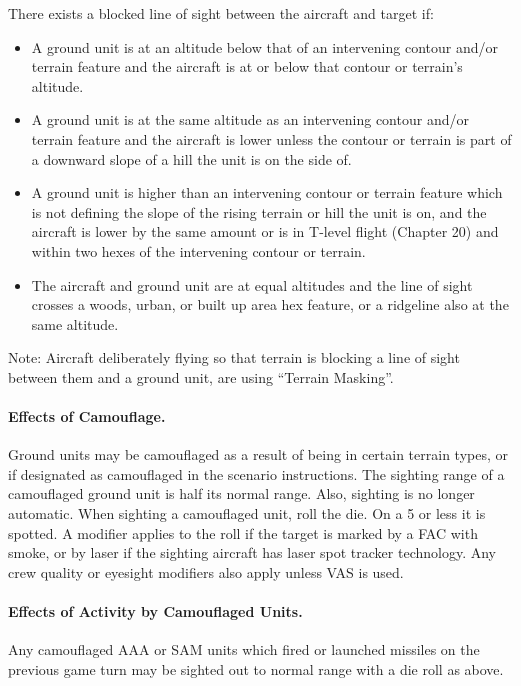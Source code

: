 There exists a blocked line of sight between the aircraft and target if:

\begin{itemize}

    \item A ground unit is at an altitude below that of an intervening contour and/or terrain feature and the aircraft is at or below that contour or terrain's altitude.

    \item A ground unit is at the same altitude as an intervening contour and/or terrain feature and the aircraft is lower unless the contour or terrain is part of a downward slope of a hill the unit is on the side of.

    \item A ground unit is higher than an intervening contour or terrain feature which is not defining the slope of the rising terrain or hill the unit is on, and the aircraft is lower by the same amount or is in T-level flight (Chapter 20) and within two hexes of the intervening contour or terrain.

    \item The aircraft and ground unit are at equal altitudes and the line of sight crosses a woods, urban, or built up area hex feature, or a ridgeline also at the same altitude.

\end{itemize}

Note: Aircraft deliberately flying so that terrain is blocking a line of sight between them and a ground unit, are using “Terrain Masking”.

\paragraph{Effects of Camouflage.} Ground units may be camouflaged as a result of being in certain terrain types, or if designated as camouflaged in the scenario instructions. The sighting range of a camouflaged ground unit is half its normal range. Also, sighting is no longer automatic. When sighting a camouflaged unit, roll the die. On a 5 or less it is spotted. A  modifier applies to the roll if the target is marked by a FAC with smoke, or by laser if the sighting aircraft has laser spot tracker technology. Any crew quality or eyesight modifiers also apply unless VAS is used.

\paragraph{Effects of Activity by Camouflaged Units.}  Any camouflaged AAA or SAM units which fired or launched missiles on the previous game turn may be sighted out to normal range with a die roll as above.

